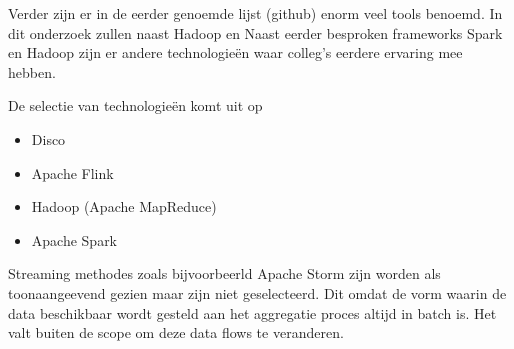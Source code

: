 Verder zijn er in de eerder genoemde lijst (github) enorm veel tools benoemd. In dit onderzoek zullen naast Hadoop en Naast eerder besproken frameworks Spark en Hadoop zijn er andere technologieën waar colleg's eerdere ervaring mee hebben.

De selectie van technologieën komt uit op

\begin{itemize}
    \item Disco
    \item Apache Flink
    \item Hadoop (Apache MapReduce)
    \item Apache Spark
\end{itemize}

Streaming methodes zoals bijvoorbeerld Apache Storm zijn worden als toonaangeevend gezien maar zijn niet geselecteerd. Dit omdat de vorm waarin de data beschikbaar wordt gesteld aan het aggregatie proces altijd in batch is. Het valt buiten de scope om deze data flows te veranderen.